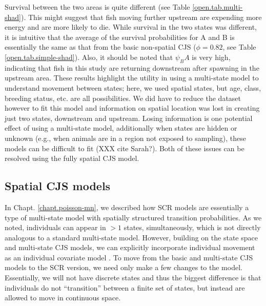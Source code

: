 Survival between the two areas is quite different (see Table \ref{open.tab.multi-shad}).  This might suggest that
fish moving further upstream are expending more energy and are more likely to die.
While survival in the two states was different, it is intuitive that the average of the survival
probabilities for A and B is essentially the same as that from the
basic non-spatial CJS ($\phi = 0.82$, see Table
\ref{open.tab.simple-shad}).   Also, it should be noted
that $\psi_BA$ is very high, indicating that fish in this study are
returning downstream after spawning in the upstream area.
These results highlight the utility in using a multi-state model to understand movement between states; here,
we used spatial states, but age, class, breeding status, etc. are all possibilities.  We did have to reduce the
dataset however to fit this model and information on spatial location was lost in creating just two states, downstream and upstream.  Losing information is one potential effect of using a multi-state model, additionally when states are hidden or unknown (e.g., when animals are in a region not exposed to 
sampling), these models can be difficult to fit (XXX cite Sarah?).  Both of these issues can be resolved using the fully spatial 
CJS model.  


\subsection{Spatial CJS models}

In Chapt. \ref{chapt.poisson-mn}, we described how SCR models are
essentially a type of multi-state model with spatially structured transition probabilities.
As we noted, individuals can appear in $>1$ states, simultaneously,
which is not directly analogous to a standard multi-state model.  However, building on the state space and
multi-state CJS models, we can
explicitly incorporate individual movement as an
individual covariate model \citep{royle_indcov:2007}.
To move from the basic and multi-state CJS models to the SCR version, we need only make a few
changes to the model.  Essentially, we will not have discrete states and thus the biggest
difference is that individuals do not ``transition'' between a finite set of states, but
instead are allowed to move in continuous space.

